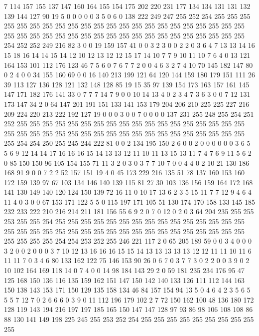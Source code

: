 7 114 157 155 137 147 160 164 155 154 175 202 220 231 177 134 134 131 131 132
139 144 127 90 19 5 0 0 0 0 0 3 5 0 6 0 138 222 249 247
255 252 254 255 255 255 255 255 255 255 255 255 255 255 255 255 255 255 255 255
255 255 255 255 255 255 255 255 255 255 255 255 255 255 255 255 255 255 255 255
255 255 255 255 254 252 252 249 216 82 3 0 0 19 159 157 41 0 0 3
2 3 0 0 2 2 0 3 6 4 7 13 13 14 16 15 18 16 14 14
15 14 12 10 12 13 12 12 15 17 14 10 7 7 9 10 11 10 7 6
4 0 13 121 164 153 101 112 176 123 46 7 5 6 0 7 6 7 7 2
0 0 4 6 3 2 7 4 10 70 145 182 147 80 0 2 4 0 0 34
155 160 69 0 0 16 140 213 199 121 64 120 144 159 180 179 151 111 26 39
113 127 136 128 121 132 148 128 85 19 15 35 97 139 154 173 163 157 161 145
147 171 182 176 141 33 0 7 7 7 14 7 9 0 0 10 14 13 4 0
2 3 4 7 3 6 3 0 0 7 12 131 173 147 34 2 0 64 147 201
191 151 133 141 153 179 204 206 210 225 225 227 216 209 224 220 213 222 192 127
19 0 0 0 3 0 0 7 0 0 0 0 137 231 255 248 255 254 251 252
255 255 255 255 255 255 255 255 255 255 255 255 255 255 255 255 255 255 255 255
255 255 255 255 255 255 255 255 255 255 255 255 255 255 255 255 255 255 254 254
250 255 245 244 222 81 0 0 2 134 195 150 2 6 0 0 2 0 0 0
0 0 0 3 6 5 5 6 9 12 14 14 17 16 16 16 15 14 13 13
12 11 10 11 13 15 13 11 7 4 7 6 9 11 5 6 2 0 85 150
150 96 105 154 155 71 11 3 2 0 3 0 3 7 7 10 7 0 0 4
4 0 2 10 21 130 186 168 91 9 0 0 7 2 2 52 157 151 19 4
0 45 173 229 216 135 51 78 137 160 153 160 172 159 139 97 67 103 134 146
140 139 115 81 27 30 103 136 156 159 164 172 168 141 130 149 140 120 124 150
139 72 16 11 0 10 17 13 6 2 3 5 15 11 7 7 12 9 4 6
4 11 4 0 3 0 0 67 153 171 122 5 5 0 115 197 171 105 51 130
174 170 158 133 145 185 232 233 222 210 216 214 211 181 156 55 6 9 2 0
7 0 12 0 2 0 3 64 204 235 255 255 253 255 255 254 255 255 255 255
255 255 255 255 255 255 255 255 255 255 255 255 255 255 255 255 255 255 255 255
255 255 255 255 255 255 255 255 255 255 255 255 255 255 254 254 253 252 255 246
221 117 2 0 65 205 189 59 0 0 3 4 0 0 0 3 2 0 0 2
0 0 0 3 7 10 12 13 16 16 16 15 15 14 13 13 13 13 13 12
12 11 11 10 11 6 11 11 7 0 3 4 6 80 133 162 122 75 146 153
90 26 0 6 7 0 3 7 7 3 0 2 2 0 0 3 9 0 2 10
102 164 169 118 14 0 7 4 0 0 14 98 184 143 29 2 0 59 181 235
234 176 95 47 125 168 150 136 116 135 159 162 151 147 150 142 140 133 126 111
112 144 163 150 138 143 153 171 150 129 135 158 134 46 84 157 154 94 13 5
0 4 6 4 2 3 5 6 5 5 5 7 12 7 0 2 6 6 6 0
3 9 0 11 112 196 179 102 2 7 72 150 162 100 48 136 180 172 128 119
143 194 216 197 197 185 165 150 147 147 128 97 93 86 98 106 108 108 86 88
130 141 149 198 225 245 255 253 252 254 255 255 255 255 255 255 255 255 255 255
